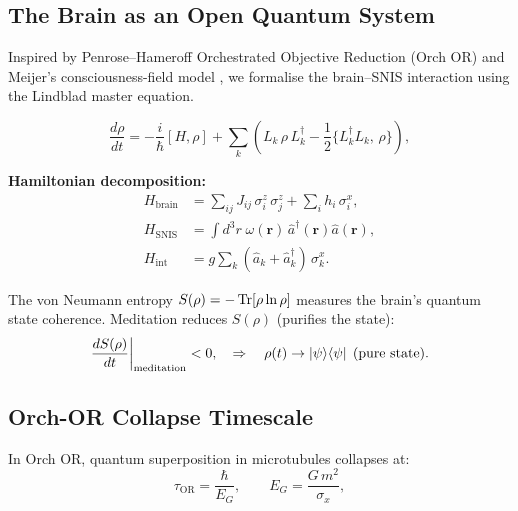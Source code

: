 \documentclass[12pt,a4paper]{article}
\theoremstyle{plain}
\theoremstyle{definition}
\theoremstyle{remark}
\begin{document}
\subsection{The Brain as an Open Quantum System}

Inspired by Penrose--Hameroff Orchestrated Objective Reduction (Orch OR)
\citep{PenroseHameroff1996} and Meijer's consciousness-field model \citep{MeijerRaggett2016}, we formalise the brain--SNIS interaction using the Lindblad master equation.

\begin{tcolorbox}[mathbox, title={Lindblad Master Equation for the Brain}]
\begin{equation}
  \frac{d\rho}{dt} = -\frac{i}{\hbar}[H, \rho]
    + \sum_k \left(L_k\,\rho\,L_k^\dagger - \frac{1}{2}\{L_k^\dagger L_k,\,\rho\}\right),
  \label{eq:lindblad}
\end{equation}
\end{tcolorbox}

\noindent\textbf{Hamiltonian decomposition:}
\begin{align}
  H_{\text{brain}}  &= \sum_{ij} J_{ij}\,\sigma_i^z\,\sigma_j^z
                       + \sum_i h_i\,\sigma_i^x, \label{eq:H_brain}\\
  H_{\text{SNIS}}   &= \int d^3r\;\omega(\mathbf{r})\,\hat{a}^\dagger(\mathbf{r})\hat{a}(\mathbf{r}), \label{eq:H_snis}\\
  H_{\text{int}}    &= g\sum_k (\hat{a}_k + \hat{a}_k^\dagger)\,\sigma_k^x. \label{eq:H_int}
\end{align}

The von Neumann entropy $S(\rho) = -\Tr[\rho\ln\rho]$ measures the brain's quantum state coherence.
Meditation reduces $S(\rho)$ (purifies the state):
\begin{equation}
  \frac{dS(\rho)}{dt}\bigg|_{\text{meditation}} < 0,\quad
  \Rightarrow\quad \rho(t) \to \ket{\psi}\!\bra{\psi}\;\text{(pure state)}.
  \label{eq:entropy_meditation}
\end{equation}

\subsection{Orch-OR Collapse Timescale}

In Orch OR, quantum superposition in microtubules collapses at:
\begin{equation}
  \tau_{\text{OR}} = \frac{\hbar}{E_G},\qquad
  E_G = \frac{G\,m^2}{\sigma_x},
  \label{eq:orch_or}
\end{equation}
\end{document}
